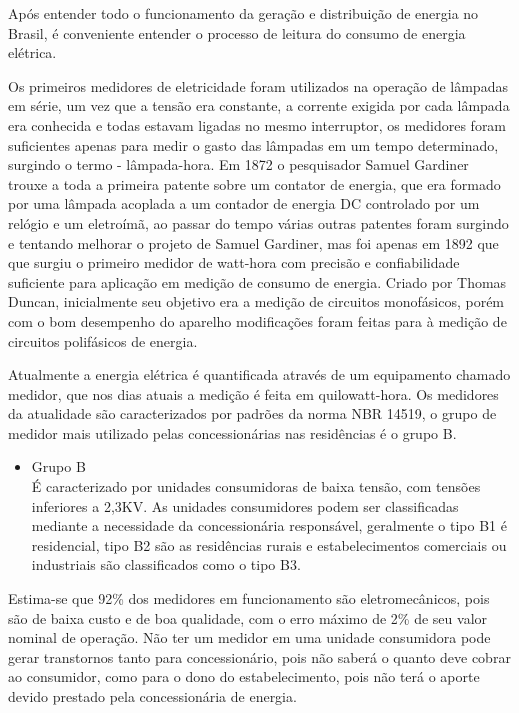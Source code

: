 \addtocounter{footnote}{-1}
\addtocounter{footnote}{1}


Após entender todo o funcionamento da geração e distribuição de energia no Brasil, é conveniente entender o processo de leitura do consumo de 
energia elétrica.

Os primeiros medidores de eletricidade foram utilizados na operação de lâmpadas em série, um vez que a tensão era constante, a corrente exigida
por cada lâmpada era conhecida e todas estavam ligadas no mesmo interruptor, os medidores foram suficientes apenas para medir o gasto das lâmpadas
em um tempo determinado, surgindo o termo - lâmpada-hora. Em 1872 o pesquisador Samuel Gardiner trouxe a toda a primeira patente sobre um contator 
de energia, que era formado por uma lâmpada acoplada a um contador de energia DC controlado por um relógio e um eletroímã, ao passar do tempo várias
outras patentes foram surgindo e tentando melhorar o projeto de Samuel Gardiner, mas foi apenas em 1892 que que surgiu o primeiro medidor de watt-hora
com precisão e confiabilidade suficiente para aplicação em medição de consumo de energia. Criado por Thomas Duncan, inicialmente seu objetivo era a medição
de circuitos monofásicos, porém com o bom desempenho do aparelho modificações foram feitas para à medição de circuitos polifásicos de energia.

Atualmente a energia elétrica é quantificada através de um equipamento chamado medidor, que nos dias atuais a medição é feita em quilowatt-hora.
Os medidores da atualidade são caracterizados por padrões da norma NBR 14519, o grupo de medidor mais utilizado pelas concessionárias nas residências
é o grupo B. 

\begin{itemize}
	\item Grupo B \\
	É caracterizado por unidades consumidoras de baixa tensão, com tensões inferiores a 2,3KV. As unidades consumidores podem ser classificadas
	mediante a necessidade da concessionária responsável, geralmente o tipo B1 é residencial, tipo B2 são as residências rurais e estabelecimentos
	comerciais ou industriais são classificados como o tipo B3.
\end{itemize}

Estima-se que 92\% dos medidores em funcionamento são eletromecânicos, pois são de baixa custo e de boa qualidade, com o erro máximo de 2\% de seu valor
nominal de operação. Não ter um medidor em uma unidade consumidora pode gerar transtornos tanto para concessionário, pois não saberá o quanto deve cobrar ao 
consumidor, como para o dono do estabelecimento, pois não terá o aporte devido prestado pela concessionária de energia.


